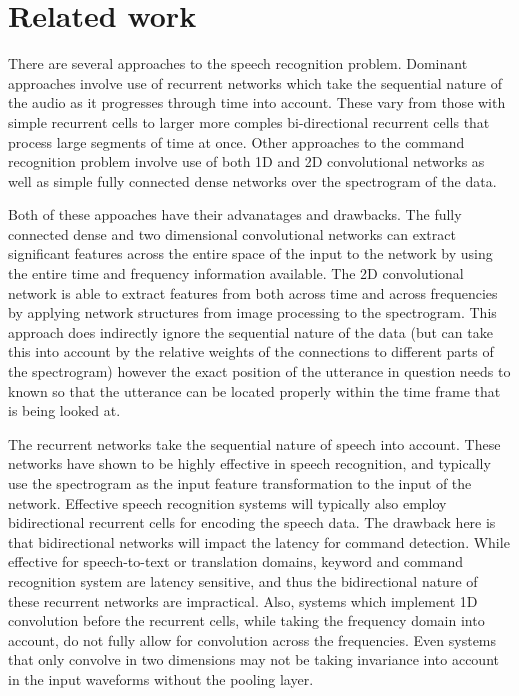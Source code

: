 \documentclass{article}
\begin{document}
\section{Related work}
There are several approaches to the speech recognition
problem. Dominant approaches involve use of recurrent networks which
take the sequential nature of the audio as it progresses through time
into account. These vary from those with simple recurrent cells to
larger more comples bi-directional recurrent cells that process large
segments of time at once\cite{amodei2016deep}. Other approaches to the
command recognition
problem involve use of both 1D and 2D convolutional
networks\cite{oxerin-baseline, arik2017convolutional} as well
as simple fully connected dense networks over the spectrogram of the
data.

Both of these appoaches have their advanatages and drawbacks. The
fully connected dense and two dimensional convolutional
networks can extract significant features across the entire space of
the input to the network by using the entire time and frequency
information available\cite{hinton2012deep}. The 2D convolutional
network is able to extract
features from both across time and across frequencies by applying
network structures from image processing to the
spectrogram\cite{sainath2015convolutional}. This
approach does indirectly ignore the sequential nature of the data (but
can take
this into account by the relative weights of the connections to
different parts of the spectrogram) however the exact position of the
utterance in question needs to known so that the utterance can be
located properly within the time frame that is being looked at.

The recurrent networks take the sequential nature of speech into
account. These networks have shown to be highly effective in speech
recognition, and typically use the spectrogram as the input feature
transformation to the input of the network. Effective speech
recognition systems will typically also employ bidirectional recurrent
cells for encoding the speech data\cite{zhang2017hello}. The drawback
here is that
bidirectional networks will impact the latency for command
detection. While effective for speech-to-text or translation domains,
keyword and command recognition system are latency sensitive, and thus
the bidirectional nature of these recurrent networks are
impractical. Also, systems which implement 1D convolution before the
recurrent cells, while taking the frequency domain into account, do
not fully allow for convolution across the frequencies. Even systems
that only convolve in two dimensions may not be taking invariance into
account in the input waveforms without the pooling layer.
\end{document}
